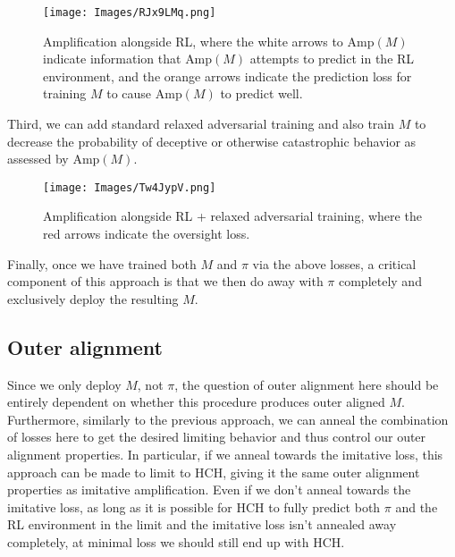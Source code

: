 \documentclass[
  onecolumn,
  natbib,
]{miri-tech-article}
\begin{document}
\vspace{4mm}

\begin{figure}[H]
  \centering
  \texttt{[image: Images/RJx9LMq.png]}
  \caption{Amplification alongside RL, where the white arrows to $\text{Amp}(M)$ indicate information that $\text{Amp}(M)$ attempts to predict in the RL environment, and the orange arrows indicate the prediction loss for training $M$ to cause $\text{Amp}(M)$ to predict well.}
\end{figure}

\vspace{2mm}

\noindent Third, we can add standard relaxed adversarial training and also train $M$ to decrease the probability of deceptive or otherwise catastrophic behavior as assessed by $\text{Amp}(M)$.

\begin{figure}[H]
    \centering
    \texttt{[image: Images/Tw4JypV.png]}
    \caption{Amplification alongside RL + relaxed adversarial training, where the red arrows indicate the oversight loss.}
\end{figure}

\vspace{2mm}

\noindent Finally, once we have trained both $M$ and $\pi$ via the above losses, a critical component of this approach is that we then do away with $\pi$ completely and exclusively deploy the resulting $M$.

\subsection{Outer alignment} Since we only deploy $M$, not $\pi$, the question of outer alignment here should be entirely dependent on whether this procedure produces outer aligned $M$. Furthermore, similarly to the previous approach, we can anneal the combination of losses here to get the desired limiting behavior and thus control our outer alignment properties. In particular, if we anneal towards the imitative loss, this approach can be made to limit to HCH, giving it the same outer alignment properties as imitative amplification. Even if we don't anneal towards the imitative loss, as long as it is possible for HCH to fully predict both $\pi$ and the RL environment in the limit and the imitative loss isn't annealed away completely, at minimal loss we should still end up with HCH.
\end{document}
